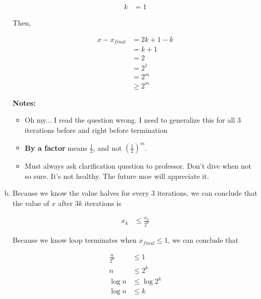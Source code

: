 \documentclass[12pt]{article}
\begin{document}
\begin{enumerate}[a.]
    \begin{align}
        k &= 1
    \end{align}

    \bigskip

    Then,

    \begin{align}
        x - x_{final} &= 2k + 1 - k\\
        &= k + 1\\
        &= 2\\
        &= 2^1\\
        &= 2^m\\
        &\geq 2^m
    \end{align}

    \textbf{Notes:}

    \begin{itemize}
        \item Oh my... I read the question wrong. I need to generalize this for
        all 3 iterations before and right before termination
        \item \textbf{By a factor} means $\frac{1}{2}$, and not $\left( \frac{1}{2} \right)^m$.
        \item Must always ask clarification question to professor. Don't dive
        when not so sure. It's not healthy. The future moe will appreciate it.

    \end{itemize}

    \item

    Because we know the value halves for every 3 iterations, we can conclude that
    the value of $x$ after $3k$ iterations is

    \setcounter{equation}{0}
    \begin{align}
        x_k &\leq \frac{x_0}{2^k}
    \end{align}

    \bigskip

    Because we know loop terminates when $x_{final} \leq 1$, we can conclude that

    \begin{align}
        \frac{n}{2^k} &\leq 1\\
        n &\leq 2^k\\
        \log n &\leq \log 2^k\\
        \log n &\leq k
    \end{align}

    \bigskip


\end{enumerate}
\end{document}
